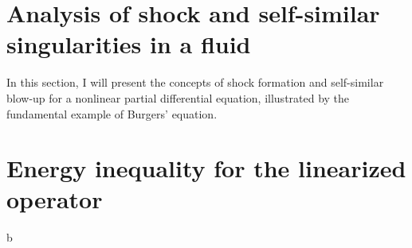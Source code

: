 \documentclass[11pt,a4paper]{article}
\begin{document}

\section{Analysis of shock and self-similar singularities in a fluid}
In this section, I will present the concepts of shock formation and self-similar blow-up for a nonlinear partial differential equation, illustrated by the fundamental example of Burgers' equation.


\section{Energy inequality for the linearized operator}
b

\end{document}
